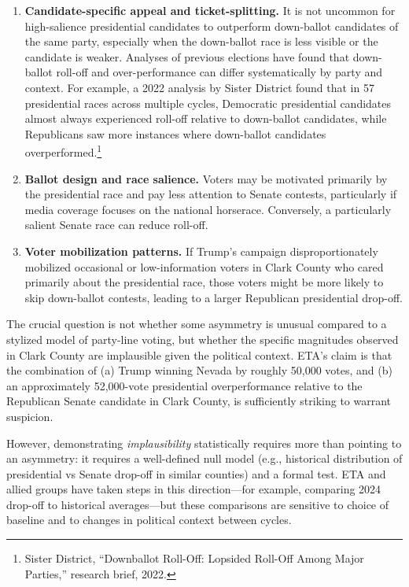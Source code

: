 \documentclass[12pt]{article}
\begin{document}
\begin{enumerate}
    \item \textbf{Candidate-specific appeal and ticket-splitting.} It is not uncommon for high-salience presidential candidates to outperform down-ballot candidates of the same party, especially when the down-ballot race is less visible or the candidate is weaker. Analyses of previous elections have found that down-ballot roll-off and over-performance can differ systematically by party and context. For example, a 2022 analysis by Sister District found that in 57 presidential races across multiple cycles, Democratic presidential candidates almost always experienced roll-off relative to down-ballot candidates, while Republicans saw more instances where down-ballot candidates overperformed.\footnote{Sister District, ``Downballot Roll-Off: Lopsided Roll-Off Among Major Parties,'' research brief, 2022.}

    \item \textbf{Ballot design and race salience.} Voters may be motivated primarily by the presidential race and pay less attention to Senate contests, particularly if media coverage focuses on the national horserace. Conversely, a particularly salient Senate race can reduce roll-off.

    \item \textbf{Voter mobilization patterns.} If Trump's campaign disproportionately mobilized occasional or low-information voters in Clark County who cared primarily about the presidential race, those voters might be more likely to skip down-ballot contests, leading to a larger Republican presidential drop-off.
\end{enumerate}

The crucial question is not whether some asymmetry is unusual compared to a stylized model of party-line voting, but whether the specific magnitudes observed in Clark County are implausible given the political context. ETA's claim is that the combination of (a) Trump winning Nevada by roughly 50,000 votes, and (b) an approximately 52,000-vote presidential overperformance relative to the Republican Senate candidate in Clark County, is sufficiently striking to warrant suspicion.

However, demonstrating \emph{implausibility} statistically requires more than pointing to an asymmetry: it requires a well-defined null model (e.g., historical distribution of presidential vs Senate drop-off in similar counties) and a formal test. ETA and allied groups have taken steps in this direction---for example, comparing 2024 drop-off to historical averages---but these comparisons are sensitive to choice of baseline and to changes in political context between cycles.
\end{document}
